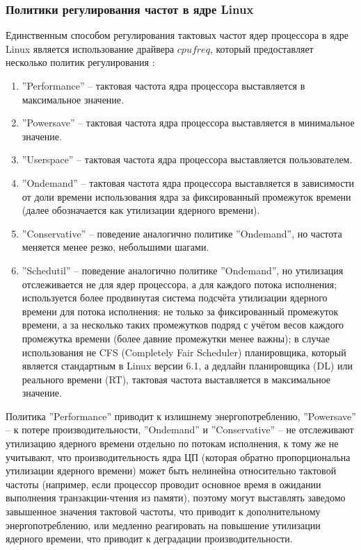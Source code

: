 \subsubsection{Политики регулирования частот в ядре Linux}

    Единственным способом регулирования тактовых частот ядер процессора в ядре Linux является
    использование драйвера $cpufreq$, который предоставляет несколько политик
    регулирования \cite{KernelCPUfreq}:
    \begin{enumerate}
        \item ''Performance'' -- тактовая частота ядра процессора выставляется в максимальное значение.
        \item ''Powersave'' -- тактовая частота ядра процессора выставляется в минимальное значение.
        \item ''Userspace'' -- тактовая частота ядра процессора выставляется пользователем.
        \item ''Ondemand'' -- тактовая частота ядра процессора выставляется в зависимости от доли времени
        использования ядра за фиксированный промежуток времени (далее обозначается как утилизации
        ядерного времени).
        \item ''Conservative'' -- поведение аналогично политике ''Ondemand'', но частота меняется менее
        резко, небольшими шагами.
        \item ''Schedutil'' \cite{KernelDocsSchedutil} -- поведение аналогично политике ''Ondemand'',
        но утилизация отслеживается не для ядер процессора, а для каждого потока исполнения;
        используется более продвинутая система подсчёта утилизации ядерного времени для потока исполнения:
        не только за фиксированный промежуток времени, а за несколько таких промежутков подряд с учётом
        весов каждого промежутка времени (более давние промежутки менее важны); в случае использования
        не CFS (Completely Fair Scheduler) планировщика, который является стандартным в Linux версии 6.1,
        а дедлайн планировщика (DL) или реального времени (RT), тактовая частота выставляется в
        максимальное значение.
    \end{enumerate}

    Политика ''Performance'' приводит к излишнему энергопотреблению, ''Powersave'' -- к потере
    производительности, ''Ondemand'' и ''Conservative'' -- не отслеживают утилизацию ядерного времени
    отдельно по потокам исполнения, к тому же не учитывают, что производительность ядра ЦП (которая
    обратно пропорциональна утилизации ядерного времени) может быть нелинейна относительно тактовой
    частоты (например, если процессор проводит основное время в ожидании выполнения транзакции-чтения
    из памяти), поэтому могут выставлять заведомо завышенное значения тактовой частоты, что приводит
    к дополнительному энергопотреблению, или медленно реагировать на повышение утилизации ядерного времени,
    что приводит к деградации производительности.


